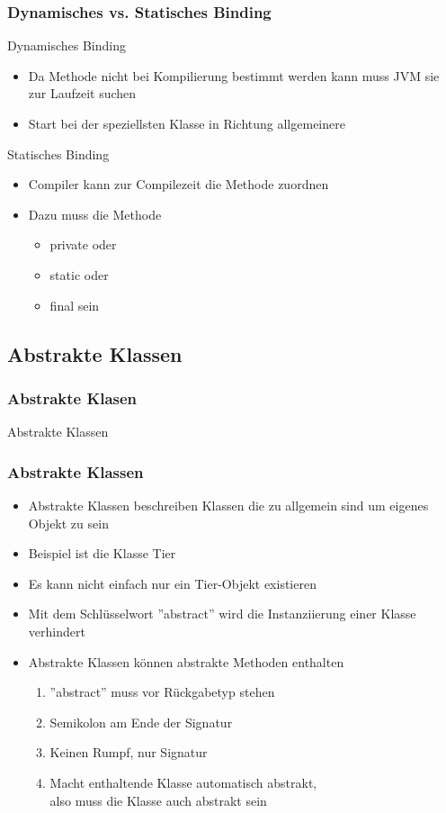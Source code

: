 \begin{frame}[fragile]
	\frametitle{Dynamisches vs. Statisches Binding}
		\begin{block}{Dynamisches Binding}
			\begin{itemize}
			  \item Da Methode nicht bei Kompilierung bestimmt werden kann
			  muss JVM sie zur Laufzeit suchen
			  \item Start bei der speziellsten Klasse 
			  in Richtung allgemeinere
			\end{itemize}
		\end{block}
		\begin{block}{Statisches Binding}
			\begin{itemize}
			  \item Compiler kann zur Compilezeit die Methode
			  zuordnen
			  \item Dazu muss die Methode
				  	\begin{itemize}
				   	 	\item private oder
				   	 	\item static oder
				   	 	\item final sein 
					\end{itemize}
			\end{itemize}
		\end{block}   
\end{frame}



\subsection{Abstrakte Klassen}
\begin{frame}[fragile]
	\frametitle{Abstrakte Klasen}
	\huge Abstrakte Klassen
\end{frame}

\begin{frame}[fragile]
	\frametitle{Abstrakte Klassen}
	\begin{itemize}
	  \item Abstrakte Klassen beschreiben Klassen
	  die zu allgemein sind um eigenes Objekt zu sein
	  \item Beispiel ist die Klasse Tier
	  \item Es kann nicht einfach nur ein Tier-Objekt 
	  existieren
	  \item Mit dem Schl\"usselwort ''abstract'' wird
	  die Instanziierung einer Klasse verhindert
	  \item Abstrakte Klassen k\"onnen abstrakte
	  Methoden enthalten
	  \begin{enumerate}
	    \item ''abstract'' muss vor R\"uckgabetyp stehen
	    \item Semikolon am Ende der Signatur
	    \item Keinen Rumpf, nur Signatur
	    \item Macht enthaltende Klasse automatisch abstrakt,\\
	    also muss die Klasse auch abstrakt sein
	  \end{enumerate}
	\end{itemize}
\end{frame}

